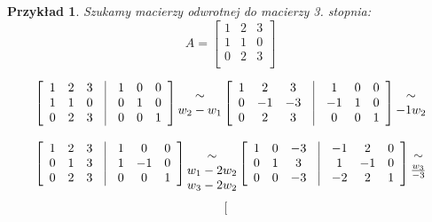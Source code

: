 \documentclass[12pt]{article}
\newtheorem{example}{Przykład}
\begin{document}
\begin{example}
Szukamy macierzy odwrotnej do macierzy 3. stopnia:
$$
A = 
\left[
\begin{array}{ccc}
1 & 2 & 3 \\
1 & 1 & 0 \\
0 & 2 & 3 \\
\end{array}
\right]
$$

$$
\left[
\begin{array}{ccccccc}
1& 2 & 3 & \vrule & 1 & 0 & 0 \\
1 & 1 & 0 & \vrule & 0 & 1 & 0 \\
0 & 2 & 3 & \vrule & 0 & 0 & 1
\end{array} 
\right]
\begin{matrix}
    \sim\\
    w_2-w_1\\
\end{matrix}
\left[
\begin{array}{ccccccc}
1& 2 & 3 & \vrule & 1 & 0 & 0 \\
0 & -1 & -3 & \vrule & -1 & 1 & 0 \\
0 & 2 & 3 & \vrule & 0 & 0 & 1
\end{array} 
\right]
\begin{matrix}
    \sim\\
    -1 w_2
\end{matrix}
$$
$$
\left[
\begin{array}{ccccccc}
1& 2 & 3 & \vrule & 1 & 0 & 0 \\
0 & 1 & 3 & \vrule & 1 & -1 & 0 \\
0 & 2 & 3 & \vrule & 0 & 0 & 1
\end{array} 
\right]
\begin{matrix}
\\
    \sim\\
    w_1 - 2 w_2\\
    w_3 - 2 w_2 
\end{matrix}
\left[
\begin{array}{ccccccc}
1& 0 & -3 & \vrule & -1 & 2 & 0 \\
0 & 1 & 3 & \vrule & 1 & -1 & 0 \\
0 & 0 & -3 & \vrule & -2 & 2 & 1
\end{array} 
\right]
\begin{matrix}
    \sim\\
    \frac{w_3}{-3}\\
\end{matrix}
$$
$$
\left[
\begin{array}{ccccccc}

\end{array}$$
\end{example}
\end{document}
